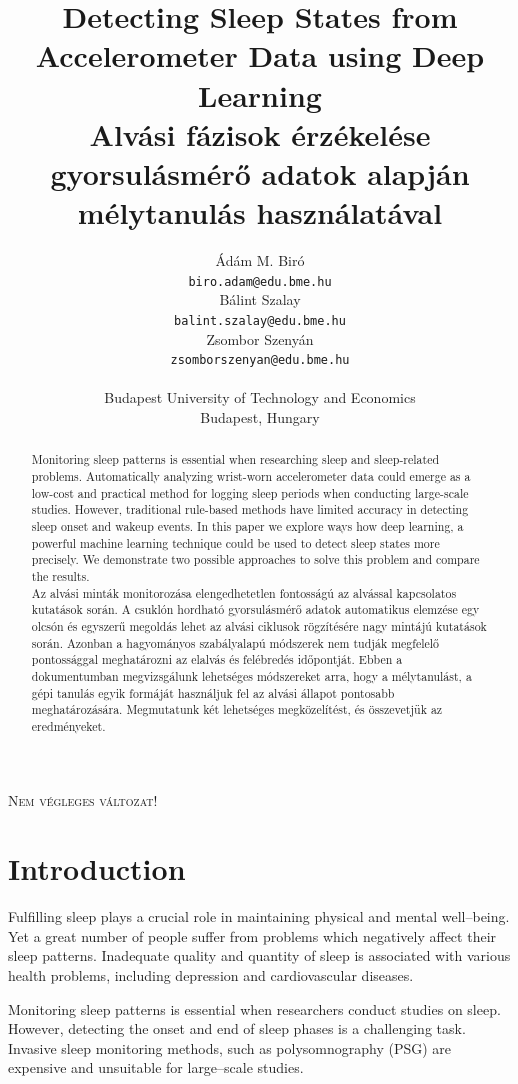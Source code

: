 \documentclass{article}
\title{
  Detecting Sleep States from Accelerometer Data using Deep Learning\\[1ex]
  Alvási fázisok érzékelése gyorsulásmérő adatok alapján mélytanulás használatával
}
\author{%
  Ádám M. Biró \\
  \texttt{biro.adam@edu.bme.hu} \\
  \And
  Bálint Szalay \\
  \texttt{balint.szalay@edu.bme.hu} \\
  \And
  Zsombor Szenyán \\
  \texttt{zsomborszenyan@edu.bme.hu} \\
  \AND
  \\
  Budapest University of Technology and Economics\\
  Budapest, Hungary \\
}
\begin{document}
\maketitle

\begin{center}
    \large
    \textsc{Nem végleges változat!}
\end{center}

\begin{abstract}
  Monitoring sleep patterns is essential when researching sleep and sleep-related problems. Automatically analyzing wrist-worn accelerometer data could emerge as a low-cost and practical method for logging sleep periods when conducting large-scale studies. However, traditional rule-based methods have limited accuracy in detecting sleep onset and wakeup events. In this paper we explore ways how deep learning, a powerful machine learning technique could be used to detect sleep states more precisely. We demonstrate two possible approaches to solve this problem and compare the results.\\[2ex]
  Az alvási minták monitorozása elengedhetetlen fontosságú az alvással kapcsolatos kutatások során. A csuklón hordható gyorsulásmérő adatok automatikus elemzése egy olcsón és egyszerű megoldás lehet az alvási ciklusok rögzítésére nagy mintájú kutatások során. Azonban a hagyományos szabályalapú módszerek nem tudják megfelelő pontossággal meghatározni az elalvás és felébredés időpontját. Ebben a dokumentumban megvizsgálunk lehetséges módszereket arra, hogy a mélytanulást, a gépi tanulás egyik formáját használjuk fel az alvási állapot pontosabb meghatározására. Megmutatunk két lehetséges megközelítést, és összevetjük az eredményeket.
\end{abstract}

\section{Introduction}

Fulfilling sleep plays a crucial role in maintaining physical and mental well–being. Yet a great number of people suffer from problems which negatively affect their sleep patterns. Inadequate quality and quantity of sleep is associated with various health problems, including depression and cardiovascular diseases.

Monitoring sleep patterns is essential when researchers conduct studies on sleep. However, detecting the onset and end of sleep phases is a challenging task. Invasive sleep monitoring methods, such as polysomnography (PSG) are expensive and unsuitable for large–scale studies.
\end{document}
